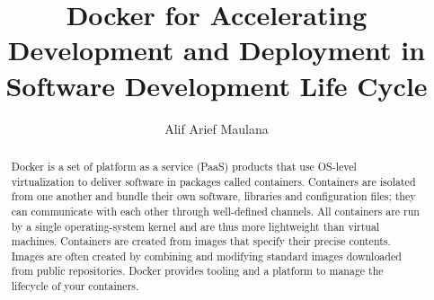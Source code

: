 \documentclass[10pt, a4paper]{article}
\begin{document}
\title{\textbf{Docker for Accelerating Development and Deployment in Software Development Life Cycle}}
\author{Alif Arief Maulana}

\maketitle

\begin{abstract}
Docker is a set of platform as a service (PaaS) products that use OS-level virtualization to deliver software in packages called containers. Containers are isolated from one another and bundle their own software, libraries and configuration files; they can communicate with each other through well-defined channels. All containers are run by a single operating-system kernel and are thus more lightweight than virtual machines. Containers are created from images that specify their precise contents. Images are often created by combining and modifying standard images downloaded from public repositories. Docker provides tooling and a platform to manage the lifecycle of your containers.
\end{abstract}







\printbibliography
\end{document}
